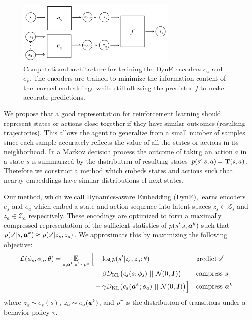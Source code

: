 \begin{figure}[t]
\includegraphics[width=0.7\textwidth]{figures/dyne/model_diagram.pdf}
\centering
\caption{Computational architecture for training the DynE encoders $e_a$ and $e_s$. The encoders are trained to minimize the information content of the learned embeddings while still allowing the predictor $f$ to make accurate predictions.}
\label{fig:model}
\end{figure}

We propose that a good representation for reinforcement learning should represent states or actions close together if they have similar outcomes (resulting trajectories).
This allows the agent to generalize from a small number of samples since each sample accurately reflects the value of all the states or actions in its neighborhood.
In a Markov decision process the outcome of taking an action $a$ in a state $s$ is summarized by the distribution of resulting states $p(s' | s, a) = \mathbf{T}(s, a)$.
Therefore we construct a method which embeds states and actions such that nearby embeddings have similar distributions of next states.




Our method, which we call Dynamics-aware Embedding (DynE), learns encoders $e_s$ and $e_a$ which embed a state and action sequence into latent spaces $z_s \in \mathcal{Z}_s$ and $z_a \in \mathcal{Z}_a$ respectively.
These encodings are optimized to form a maximally compressed representation of the sufficient statistics of $p(s' | s, {\bm{a}}^k)$ such that $p(s' | s, {\bm{a}}^k) \approx p(s' | z_s, z_a)$.
We approximate this by maximizing the following objective:
\begin{align}
\mathcal{L}(\phi_s, \phi_a, \theta) = \E_{s, \va^k, s' \sim \rho^\pi} \Big[ & - \log p(s' | z_s, z_a; \theta)    && \text{predict } s' \label{eq:logprob} \\
 &+ \beta \KL{e_s(s; \phi_s)}{\mathcal{N}(0, \mI)}      && \text{compress } s  \label{eq:skl} \\
 &+ \gamma \KL{e_a(\va^k; \phi_a)}{\mathcal{N}(0, \mI)} \Big]       && \text{compress } \va^k  \label{eq:akl}
\end{align}
where $z_s \sim e_s(s)$, $z_a \sim e_a({\bm{a}}^k)$, and $\rho^\pi$ is the distribution of transitions under a behavior policy $\pi$.

